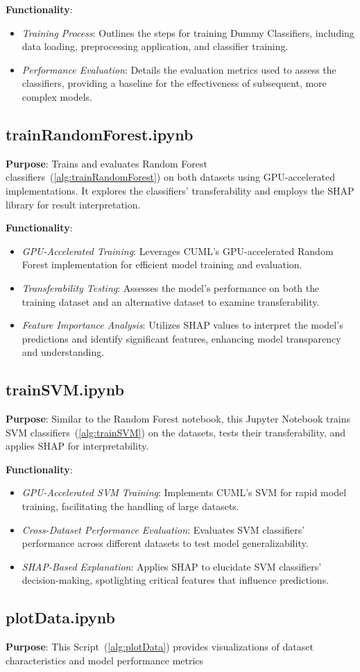 \textbf{Functionality}:
\begin{itemize}
    \item \textit{Training Process}: Outlines the steps for training Dummy Classifiers, including data loading, preprocessing application, and classifier training.
    \item \textit{Performance Evaluation}: Details the evaluation metrics used to assess the classifiers, providing a baseline for the effectiveness of subsequent, more complex models.
\end{itemize}

\subsection{trainRandomForest.ipynb}
\textbf{Purpose}: Trains and evaluates Random Forest classifiers~(\ref{alg:trainRandomForest}) on both datasets using GPU-accelerated implementations. It explores the classifiers' transferability and employs the SHAP library for result interpretation.

\textbf{Functionality}:
\begin{itemize}
    \item \textit{GPU-Accelerated Training}: Leverages CUML’s GPU-accelerated Random Forest implementation for efficient model training and evaluation.
    \item \textit{Transferability Testing}: Assesses the model's performance on both the training dataset and an alternative dataset to examine transferability.
    \item \textit{Feature Importance Analysis}: Utilizes SHAP values to interpret the model's predictions and identify significant features, enhancing model transparency and understanding.
\end{itemize}

\subsection{trainSVM.ipynb}
\textbf{Purpose}: Similar to the Random Forest notebook, this Jupyter Notebook trains SVM classifiers~(\ref{alg:trainSVM}) on the datasets, tests their transferability, and applies SHAP for interpretability.

\textbf{Functionality}:
\begin{itemize}
    \item \textit{GPU-Accelerated SVM Training}: Implements CUML’s SVM for rapid model training, facilitating the handling of large datasets.
    \item \textit{Cross-Dataset Performance Evaluation}: Evaluates SVM classifiers' performance across different datasets to test model generalizability.
    \item \textit{SHAP-Based Explanation}: Applies SHAP to elucidate SVM classifiers' decision-making, spotlighting critical features that influence predictions.
\end{itemize}

\subsection{plotData.ipynb}
\textbf{Purpose}: This Script~(\ref{alg:plotData}) provides visualizations of dataset characteristics and model performance metrics
